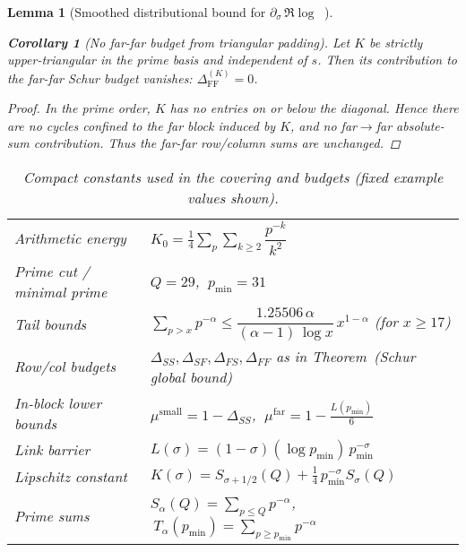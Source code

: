 \documentclass[11pt]{article}
\newtheorem{lemma}[theorem]{Lemma}
\newtheorem{corollary}[theorem]{Corollary}
\theoremstyle{definition}
\theoremstyle{remark}
\DeclareMathOperator{\dettwo}{det_2}
\begin{document}
\begin{lemma}[Smoothed distributional bound for $\partial_\sigma\,\Re\log\dettwo$]
\begin{corollary}[No far-far budget from triangular padding]\label{cor:K-no-FF}
Let $K$ be strictly upper-triangular in the prime basis and independent of $s$. Then its contribution to the far-far Schur budget vanishes: $\Delta_{\mathrm{FF}}^{(K)}=0$.
\end{corollary}
\begin{proof}
In the prime order, $K$ has no entries on or below the diagonal. Hence there are no cycles confined to the far block induced by $K$, and no far$\to$far absolute-sum contribution. Thus the far-far row/column sums are unchanged.
\end{proof}
\begin{table}[H]
\centering
\caption{Compact constants used in the covering and budgets (fixed example values shown).}
\begin{tabular}{l l}
\toprule
Arithmetic energy & $K_0=\tfrac14\sum_{p}\sum_{k\ge2} \dfrac{p^{-k}}{k^2}$ \\ 
Prime cut / minimal prime & $Q=29$, $\ p_{\min}=31$ \\ 
Tail bounds & $\sum_{p>x}p^{-\alpha} \le \dfrac{1.25506\,\alpha}{(\alpha-1)\,\log x}\,x^{1-\alpha}$ (for $x\ge 17$) \\ 
Row/col budgets & $\Delta_{SS},\Delta_{SF},\Delta_{FS},\Delta_{FF}$ as in Theorem~(Schur global bound) \\ 
In-block lower bounds & $\mu^{\mathrm{small}}=1-\Delta_{SS}$, $\ \mu^{\mathrm{far}}=1-\tfrac{L(p_{\min})}{6}$ \\ 
Link barrier & $L(\sigma)=(1-\sigma)(\log p_{\min})\,p_{\min}^{-\sigma}$ \\ 
Lipschitz constant & $K(\sigma)=S_{\sigma+1/2}(Q)+\tfrac14\,p_{\min}^{-\sigma}S_{\sigma}(Q)$ \\ 
Prime sums & $S_{\alpha}(Q)=\sum_{p\le Q} p^{-\alpha}$, $\ T_{\alpha}(p_{\min})=\sum_{p\ge p_{\min}} p^{-\alpha}$ \\ 
\bottomrule
\end{tabular}
\end{table}

\end{lemma}
\end{document}
